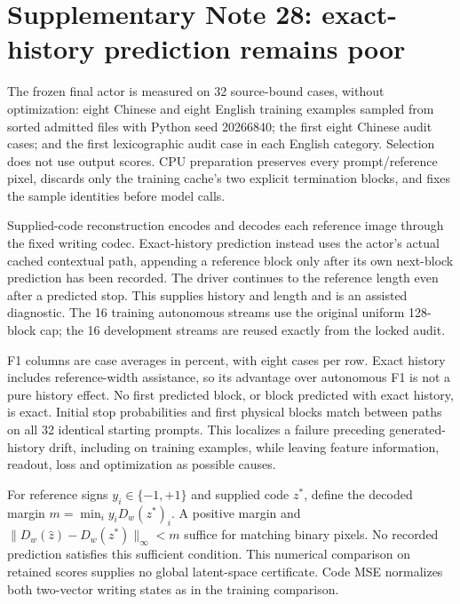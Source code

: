 \documentclass[10pt,a4paper]{article}
\begin{document}
\section*{Supplementary Note 28: exact-history prediction remains poor}
The frozen final actor is measured on 32 source-bound cases, without
optimization: eight Chinese and eight English training examples sampled from
sorted admitted files with Python seed 20266840; the first eight Chinese
audit cases; and the first lexicographic audit case in each English category.
Selection does not use output scores. CPU preparation preserves every
prompt/reference pixel, discards only the training cache's two explicit
termination blocks, and fixes the sample identities before model calls.

Supplied-code reconstruction encodes and decodes each reference image through
the fixed writing codec. Exact-history prediction instead uses the actor's
actual cached contextual path, appending a reference block only after its
own next-block prediction has been recorded. The driver continues to the
reference length even after a predicted stop. This supplies history and
length and is an assisted diagnostic. The 16 training autonomous streams use
the original uniform 128-block cap; the 16 development streams are reused
exactly from the locked audit.

\begin{center}\small

\end{center}

F1 columns are case averages in percent, with eight cases per row. Exact
history includes reference-width assistance, so its advantage over autonomous
F1 is not a pure history effect. No first predicted block, or block predicted
with exact history, is exact. Initial stop probabilities and first physical
blocks match between paths on all 32 identical starting prompts. This
localizes a failure preceding generated-history drift, including on training
examples, while leaving feature information, readout, loss and optimization
as possible causes.

For reference signs $y_i\in\{-1,+1\}$ and supplied code $z^*$, define the
decoded margin $m=\min_i y_iD_w(z^*)_i$. A positive margin and
$\|D_w(\widehat z)-D_w(z^*)\|_\infty<m$ suffice for matching binary pixels.
No recorded prediction satisfies this sufficient condition. This numerical
comparison on retained scores supplies no global latent-space certificate.
Code MSE normalizes both two-vector writing states as in the training
comparison.
\end{document}
